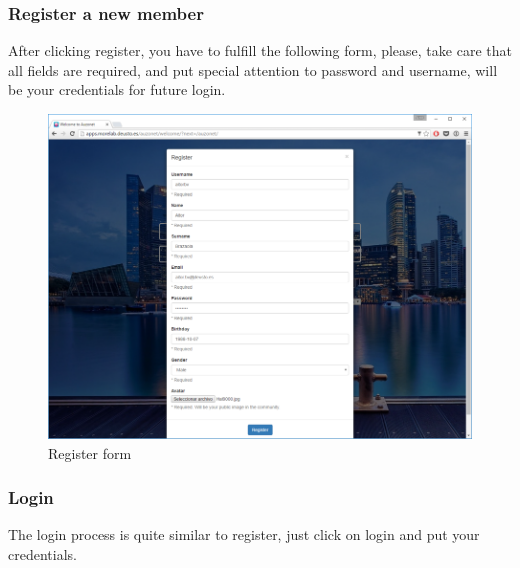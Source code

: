 \documentclass{DeustoFDP}
\begin{document}
\subsubsection{Register a new member}
After clicking register, you have to fulfill the following form, please, take care that all fields are required, and put special attention to password and username, will be your credentials for future login.
\begin{figure}[h!]
\centering
\includegraphics[width=0.9\linewidth]{fig/Manual/register}
\caption[Register form]{Register form}
\label{fig:register}
\end{figure}

\subsubsection{Login}
The login process is quite similar to register, just click on login and put your credentials.
\end{document}
